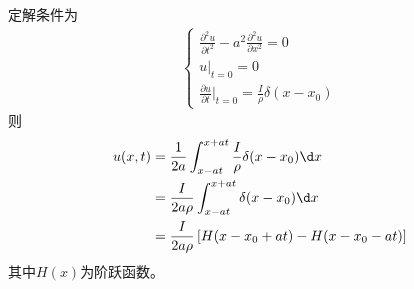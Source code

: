 \documentclass{phyasgn}
\begin{document}
\begin{sol}[1]
    定解条件为
    \begin{align*}
        \left\{
            \begin{matrix}
                \frac{\partial^2u}{\partial t^2}-a^2\frac{\partial^2u}{\partial x^2}=0\\
                u|_{t=0}=0\\
                \frac{\partial u}{\partial t}|_{t=0}=\frac{I}{\rho}\delta(x-x_0)
            \end{matrix}\right.
    \end{align*}
    则\begin{align*}
        u(x,t)&=\frac{1}{2a}\int_{x-at}^{x+at}\frac{I}{\rho}\delta(x-x_0)\d x\\
        &=\frac{I}{2a\rho}\int_{x-at}^{x+at}\delta(x-x_0)\d x\\
        &=\frac{I}{2a\rho}\left[H(x-x_0+at)-H(x-x_0-at)\right]
    \end{align*}
    其中$H(x)$为阶跃函数。
\end{sol}\par
\end{document}
